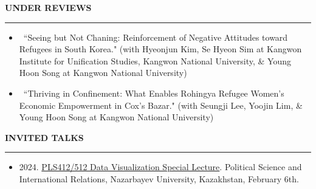 \documentclass[
  16,
]{article}
\begin{document}
\vspace{7pt}

\begin{large}{\bf UNDER REVIEWS}

  \vspace{3pt}

  \hrule

\end{large}
\begin{itemize}

  \item[2,] ~``Seeing but Not Chaning: Reinforcement of Negative Attitudes toward Refugees in South Korea." (with Hyeonjun Kim, Se Hyeon Sim at Kangwon Institute for Unification Studies, Kangwon National University, \& Young Hoon Song at Kangwon National University) 
  \item[1.] ~``Thriving in Confinement: What Enables Rohingya Refugee Women's Economic Empowerment in Cox's Bazar." (with Seungji Lee, Yoojin Lim, \& Young Hoon Song at Kangwon National University)

\end{itemize}

\vspace{7pt}

\begin{large}{\bf INVITED TALKS}
  \vspace{3pt}
  \hrule
\end{large}
\begin{itemize}
\item 2024. \href{https://pherephobia.github.io/3_NazarbayevDS/}{PLS412/512 Data Visualization Special Lecture}. Political Science and International Relations, Nazarbayev University, Kazakhstan, February 6th.
\end{itemize}

\vspace{7pt}
\end{document}
